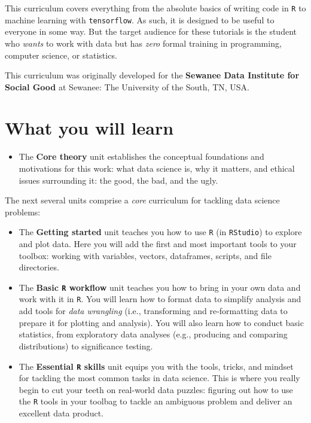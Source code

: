 \documentclass[
]{book}
\providecommand{\tightlist}{%
  \setlength{\itemsep}{0pt}\setlength{\parskip}{0pt}}
\begin{document}
This curriculum covers everything from the absolute basics of writing code in \texttt{R} to machine learning with \texttt{tensorflow}. As such, it is designed to be useful to everyone in some way. But the target audience for these tutorials is the student who \emph{wants} to work with data but has \emph{zero} formal training in programming, computer science, or statistics.

This curriculum was originally developed for the \textbf{Sewanee Data Institute for Social Good} at Sewanee: The University of the South, TN, USA.

\hypertarget{what-you-will-learn}{%
\section*{What you will learn}\label{what-you-will-learn}}

\begin{itemize}
\tightlist
\item
  The \textbf{Core theory} unit establishes the conceptual foundations and motivations for this work: what data science is, why it matters, and ethical issues surrounding it: the good, the bad, and the ugly.
\end{itemize}

The next several units comprise a \emph{core} curriculum for tackling data science problems:

\begin{itemize}
\item
  The \textbf{Getting started} unit teaches you how to use \texttt{R} (in \texttt{RStudio}) to explore and plot data. Here you will add the first and most important tools to your toolbox: working with variables, vectors, dataframes, scripts, and file directories.
\item
  The \textbf{Basic \texttt{R} workflow} unit teaches you how to bring in your own data and work with it in \texttt{R}. You will learn how to format data to simplify analysis and add tools for \emph{data wrangling} (i.e., transforming and re-formatting data to prepare it for plotting and analysis). You will also learn how to conduct basic statistics, from exploratory data analyses (e.g., producing and comparing distributions) to significance testing.
\item
  The \textbf{Essential \texttt{R} skills} unit equips you with the tools, tricks, and mindset for tackling the most common tasks in data science. This is where you really begin to cut your teeth on real-world data puzzles: figuring out how to use the \texttt{R} tools in your toolbag to tackle an ambiguous problem and deliver an excellent data product.
\end{itemize}
\end{document}
